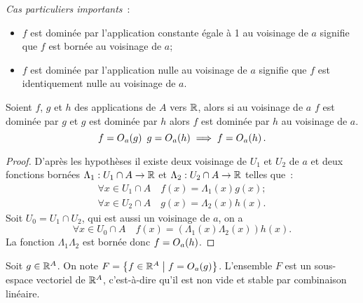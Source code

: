 \emph{Cas particuliers importants}~:
\begin{itemize}
  \item \(f\) est dominée par l'application constante égale à 1 au voisinage de
    \(a\) signifie que \(f\) est bornée au voisinage de \(a\);
  \item \(f\) est dominée par l'application nulle au voisinage de \(a\) signifie
    que \(f\) est identiquement nulle au voisinage de \(a\).
\end{itemize}

\begin{prop}[Transitivité]
  Soient \(f\), \(g\) et \(h\) des applications de \(A\) vers \(\mathbb{R}\), alors si
  au voisinage de \(a\) \(f\) est dominée par \(g\) et \(g\) est dominée par
  \(h\) alors \(f\) est dominée par \(h\) au voisinage de \(a\).
  \begin{equation}
    f=O\mathopen{}_{a}\left(g\right) \ g=O\mathopen{}_{a}\left(h\right) \implies f=O\mathopen{}_{a}\left(h\right).
  \end{equation}
\end{prop}
\begin{proof}
  D'après les hypothèses il existe deux voisinage de \(U_1\) et \(U_2\) de \(a\)
  et deux fonctions bornées \(\Lambda_1:U_1 \cap A \rightarrow \mathbb{R}\) et
  \(\Lambda_2:U_2 \cap A \rightarrow \mathbb{R}\) telles que~:
  \begin{gather}
    \forall x \in U_1\cap A \quad f(x)=\Lambda_1(x)g(x);\\
    \forall x \in U_2\cap A \quad g(x)=\Lambda_2(x)h(x).
  \end{gather}
  Soit \(U_0=U_1 \cap U_2\), qui est aussi un voisinage de \(a\), on a
  \begin{equation}
    \forall x \in U_0 \cap A \quad f(x) = (\Lambda_1(x) \Lambda_2(x)) h(x).
  \end{equation}
  La fonction \(\Lambda_1 \Lambda_2\) est bornée donc \(f=O\mathopen{}_{a}\left(h\right)\).
\end{proof}
\begin{prop}
  Soit \(g \in \mathbb{R}^A\). On note \(F=\left\{f \in \mathbb{R}^A\mathrel{}\middle|\mathrel{}f=O\mathopen{}_{a}\left(g\right)\right\}\).
  L'ensemble \(F\) est un sous-espace vectoriel de \(\mathbb{R}^A\), c'est-à-dire qu'il
  est non vide et stable par combinaison linéaire.
\end{prop}
